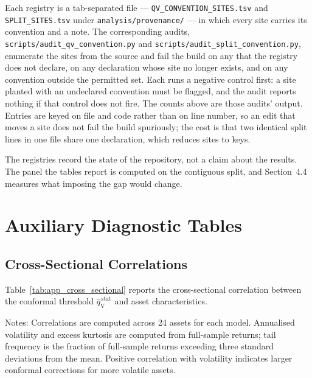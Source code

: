 \documentclass[preprint,11pt,authoryear]{elsarticle}
\newcommand{\1}{\boldsymbol{1}}
\newcommand{\qVstat}{\hat{q}_{\scriptscriptstyle\mathrm{V}}^{\,\mathrm{stat}}}
\begin{document}
Each registry is a tab-separated file --- \texttt{QV\_CONVENTION\_SITES.tsv} and
\texttt{SPLIT\_SITES.tsv} under \texttt{analysis/provenance/} --- in which every
site carries its convention and a note. The corresponding audits,
\texttt{scripts/audit\_qv\_convention.py} and
\texttt{scripts/audit\_split\_convention.py}, enumerate the sites from the source
and fail the build on any that the registry does not declare, on any declaration
whose site no longer exists, and on any convention outside the permitted set.
Each runs a negative control first: a site planted with an undeclared
convention must be flagged, and the audit reports nothing if that control does
not fire. The counts above are those audits' output. Entries are keyed on file
and code rather than on line number, so an edit that moves a site does not fail
the build spuriously; the cost is that two identical split lines in one file
share one declaration, which reduces \nSplitSites{} sites to \nSplitKeys{} keys.

The registries record the state of the repository, not a claim about the
results. The panel the tables report is computed on the contiguous split, and
Section~4.4 measures what imposing the gap would change.



\section{Auxiliary Diagnostic Tables}
\label{app:diagnostic_tables}

\subsection{Cross-Sectional Correlations}
\label{app:cross_sectional}

Table~\ref{tab:app_cross_sectional} reports the cross-sectional correlation
between the conformal threshold $\qVstat$ and asset characteristics.

\begin{table}[H]
	\centering
	\caption{Cross-sectional correlation between conformal threshold $\qVstat$
		and asset characteristics ($\alpha=0.01$).}
	\label{tab:app_cross_sectional}
	\footnotesize
	
	\begin{minipage}{\linewidth}\scriptsize
		\smallskip
		Notes: Correlations are computed across 24 assets for each model.
		Annualised volatility and excess kurtosis are computed from full-sample
		returns; tail frequency is the fraction of full-sample returns exceeding
		three standard deviations from the mean. Positive correlation with
		volatility indicates larger conformal corrections for more volatile
		assets.
	\end{minipage}
\end{table}
\end{document}
